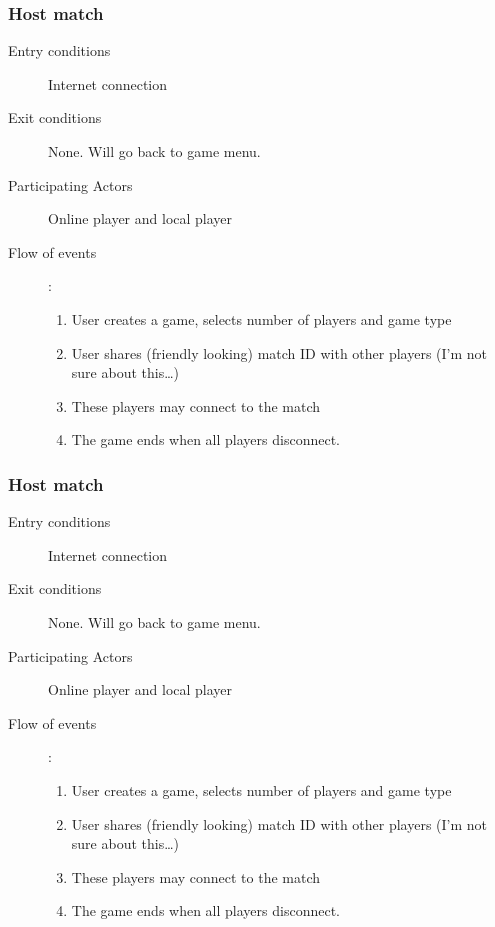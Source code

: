 \documentclass[12pt]{article}
\begin{document}
    \subsubsection{Host match}
    \begin{description}
        \item[Entry conditions] Internet connection
        \item[Exit conditions] None. Will go back to game menu.
        \item[Participating Actors] Online player and local player
        \item[Flow of events]:
            \begin{enumerate}
                \item User creates a game, selects number of players and game
                    type
                \item User shares (friendly looking) match ID with other
                    players (I’m not sure about this…)
                \item These players may connect to the match
                \item The game ends when all players disconnect.
            \end{enumerate}
    \end{description}


    \subsubsection{Host match}
    \begin{description}
        \item[Entry conditions] Internet connection
        \item[Exit conditions] None. Will go back to game menu.
        \item[Participating Actors] Online player and local player
        \item[Flow of events]:
            \begin{enumerate}
                \item User creates a game, selects number of players and game
                    type
                \item User shares (friendly looking) match ID with other
                    players (I’m not sure about this…)
                \item These players may connect to the match
                \item The game ends when all players disconnect.
            \end{enumerate}
    \end{description}
\end{document}
